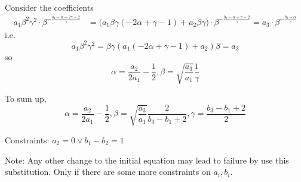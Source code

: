 \documentclass[a4paper,12pt,titlepage]{report}
\begin{document}
\newpage
Consider the coefficients
\begin{align*}
a_1\beta^2\gamma^2\cdot \beta^{-\frac{b_1-\alpha+2\gamma-2}{\gamma}}&=\Big(a_1\beta\gamma(-2\alpha+\gamma-1)+a_2\beta\gamma\Big) \cdot \beta^{-\frac{b_1-\alpha+\gamma-2}{\gamma} }=a_3\cdot\beta^{-\frac{b_3-\alpha}{\gamma}}
\end{align*}
i.e.$$a_1\beta^2\gamma^2=\beta\gamma(a_1(-2\alpha+\gamma-1)+a_2)\beta=a_3$$
so
$$\alpha=\dfrac{a_2}{2a_1}-\dfrac{1}{2},\beta=\sqrt{\dfrac{a_3}{a_1}}\dfrac{1}{\gamma}$$

To sum up,
$$\alpha=\dfrac{a_2}{2a_1}-\dfrac{1}{2},\beta=\sqrt{\dfrac{a_3}{a_1}}\dfrac{2}{b_3-b_1+2}, \gamma=\dfrac{b_3-b_1+2}{2}$$

Constraints: $a_2=0 \vee b_1-b_2=1$

Note: Any other change to the initial equation may lead to failure by use this substitution. Only if there are some more constraints on $a_i,b_i$. 
\end{document}
